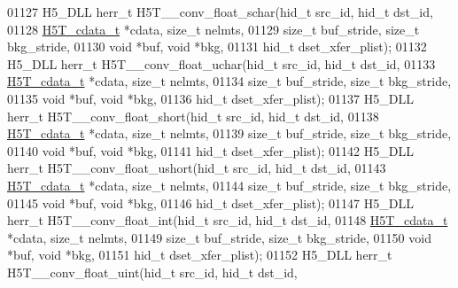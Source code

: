 \begin{DoxyCode}
01127 H5\_DLL herr\_t H5T\_\_conv\_float\_schar(hid\_t src\_id, hid\_t dst\_id,
01128                      \hyperlink{struct_h5_t__cdata__t}{H5T\_cdata\_t} *cdata, \textcolor{keywordtype}{size\_t} nelmts,
01129                      \textcolor{keywordtype}{size\_t} buf\_stride, \textcolor{keywordtype}{size\_t} bkg\_stride,
01130                                      \textcolor{keywordtype}{void} *buf, \textcolor{keywordtype}{void} *bkg,
01131                                      hid\_t dset\_xfer\_plist);
01132 H5\_DLL herr\_t H5T\_\_conv\_float\_uchar(hid\_t src\_id, hid\_t dst\_id,
01133                      \hyperlink{struct_h5_t__cdata__t}{H5T\_cdata\_t} *cdata, \textcolor{keywordtype}{size\_t} nelmts,
01134                      \textcolor{keywordtype}{size\_t} buf\_stride, \textcolor{keywordtype}{size\_t} bkg\_stride,
01135                                      \textcolor{keywordtype}{void} *buf, \textcolor{keywordtype}{void} *bkg,
01136                                      hid\_t dset\_xfer\_plist);
01137 H5\_DLL herr\_t H5T\_\_conv\_float\_short(hid\_t src\_id, hid\_t dst\_id,
01138                      \hyperlink{struct_h5_t__cdata__t}{H5T\_cdata\_t} *cdata, \textcolor{keywordtype}{size\_t} nelmts,
01139                      \textcolor{keywordtype}{size\_t} buf\_stride, \textcolor{keywordtype}{size\_t} bkg\_stride,
01140                                      \textcolor{keywordtype}{void} *buf, \textcolor{keywordtype}{void} *bkg,
01141                                      hid\_t dset\_xfer\_plist);
01142 H5\_DLL herr\_t H5T\_\_conv\_float\_ushort(hid\_t src\_id, hid\_t dst\_id,
01143                      \hyperlink{struct_h5_t__cdata__t}{H5T\_cdata\_t} *cdata, \textcolor{keywordtype}{size\_t} nelmts,
01144                      \textcolor{keywordtype}{size\_t} buf\_stride, \textcolor{keywordtype}{size\_t} bkg\_stride,
01145                                      \textcolor{keywordtype}{void} *buf, \textcolor{keywordtype}{void} *bkg,
01146                                      hid\_t dset\_xfer\_plist);
01147 H5\_DLL herr\_t H5T\_\_conv\_float\_int(hid\_t src\_id, hid\_t dst\_id,
01148                      \hyperlink{struct_h5_t__cdata__t}{H5T\_cdata\_t} *cdata, \textcolor{keywordtype}{size\_t} nelmts,
01149                      \textcolor{keywordtype}{size\_t} buf\_stride, \textcolor{keywordtype}{size\_t} bkg\_stride,
01150                                      \textcolor{keywordtype}{void} *buf, \textcolor{keywordtype}{void} *bkg,
01151                                      hid\_t dset\_xfer\_plist);
01152 H5\_DLL herr\_t H5T\_\_conv\_float\_uint(hid\_t src\_id, hid\_t dst\_id,

\end{DoxyCode}
